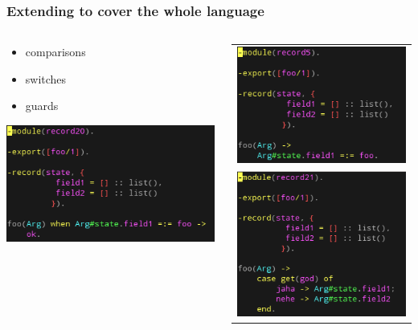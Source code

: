 \begin{frame}
\frametitle{Extending to cover the whole language}

\begin{columns}
\begin{column}[l]{3.5cm}

	\begin{block}{}
		\begin{itemize}
			\item \scriptsize{comparisons}
			\item \scriptsize{switches}
			\item \scriptsize{guards}
		\end{itemize}
	\end{block}

	\includegraphics[scale=0.4]{../figures/test20}

\end{column}

\begin{column}[r]{4.5cm}
\begin{tabular}{ c }
  	\includegraphics[scale=0.4]{../figures/test5}
\\
	\includegraphics[scale=0.4]{../figures/test21}
\end{tabular}
\end{column}
\end{columns}

\end{frame}

